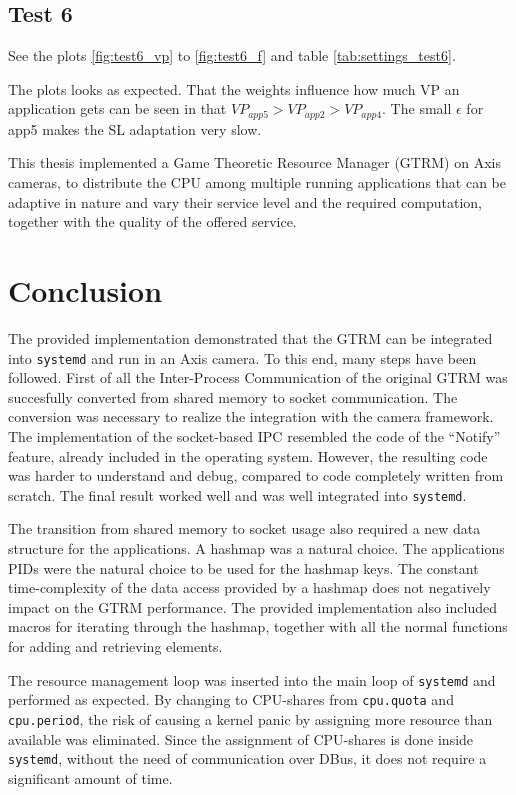 \documentclass[nobiblatex]{LTHthesis}
\begin{document}
\subsection{Test 6}
See the plots \ref{fig:test6_vp} to \ref{fig:test6_f} and table \ref{tab:settings_test6}.

The plots looks as expected.
That the weights influence how much VP an application gets can be seen in that $VP_{app5}>VP_{app2}>VP_{app4}$. 
The small $\epsilon$ for app5 makes the SL adaptation very slow.





\label{chp:conclusion}

This thesis implemented a Game Theoretic Resource Manager (GTRM) on Axis
cameras, to distribute the CPU among multiple running applications that can
be adaptive in nature and vary their service level and the required
computation, together with the quality of the offered service.

\section{Conclusion}

The provided implementation demonstrated that the GTRM can be integrated into
\texttt{systemd} and run in an Axis camera. To this end, many steps have been
followed. First of all the Inter-Process Communication of the original GTRM
was succesfully converted from shared memory to socket communication. The
conversion was necessary to realize the integration with the camera
framework. The implementation of the socket-based IPC resembled the
code of the ``Notify'' feature, already included in the operating system.
However, the resulting code was harder to understand and debug, compared to
code completely written from scratch. The final result worked well and was
well integrated into \texttt{systemd}.

The transition from shared memory to socket usage also required a new data
structure for the applications. A hashmap was a natural choice. The
applications PIDs were the natural choice to be used for the hashmap keys.
The constant time-complexity of the data access provided by a hashmap does not
negatively impact on the GTRM performance. The provided implementation also
included macros for iterating through the hashmap, together with all the
normal functions for adding and retrieving elements. 

The resource management loop was inserted into the main loop of 
\texttt{systemd} and performed as expected. By changing to CPU-shares from
\texttt{cpu.quota} and \texttt{cpu.period}, the risk of causing a kernel 
panic by assigning more resource than available was eliminated. Since the
assignment of CPU-shares is done inside \texttt{systemd}, without the need of
communication over DBus, it does not require a significant amount of time.
\end{document}
